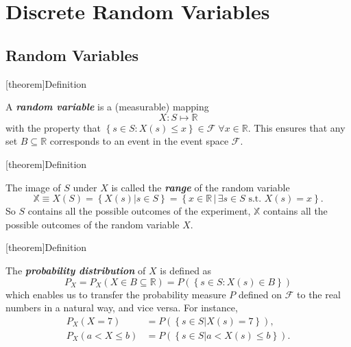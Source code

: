 \documentclass[12pt]{report}
\theoremstyle{definition}
\begin{document}
\chapter{Discrete Random Variables}

\section{Random Variables}

[theorem]{Definition}
\begin{random variable}
    A \textbf{\emph{random variable}} is a (measurable) mapping
    \[
        X:S\mapsto\mathbb{R}
    \]
    with the property that 
    $\left\{s\in S:X(s)\le x\right\}\in\mathcal{F}\;\forall x\in\mathbb{R}$.
    This ensures that any set $B\subseteq\mathbb{R}$ corresponds to an event in
    the event space $\mathcal{F}$.
\end{random variable}

[theorem]{Definition}
\begin{range of X}
    The image of $S$ under $X$ is called the \textbf{\emph{range}} of the random
    variable
    \[
        \mathbb{X}\equiv X(S)=\left\{X(s)|s\in S\right\}
        =\left\{x\in\mathbb{R}\,|\,\exists s\in S\text{ s.t. }X(s)=x\right\}.
    \]
    So $S$ contains all the possible outcomes of the experiment, 
    $\mathbb{X}$ contains all the possible outcomes of the random variable $X$.
\end{range of X}

[theorem]{Definition}
\begin{probability distribution}
    The \textbf{\emph{probability distribution}} of $X$ is defined as
    \[
        P_X = P_X(X\in B\subseteq\mathbb{R}) 
        = P(\left\{s\in S:X(s)\in B\right\})
    \]
    which enables us to transfer the probability measure $P$ defined on $\mathcal{F}$
    to the real numbers in a natural way, and vice versa. For instance,
    \begin{align*}
        P_X(X=7) & = P(\left\{s\in S|X(s) = 7\right\}), \\
        P_X(a<X\le b) & = P(\left\{s\in S|a<X(s)\le b\right\}).
    \end{align*} 
\end{probability distribution}
\end{document}

